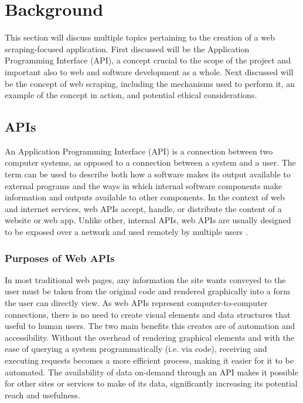 \chapter{Background}\label{bg}

This section will discuss multiple topics pertaining to the creation of a web scraping-focused application. First discussed will be the Application Programming Interface (API), a concept crucial to the scope of the project and important also to web and software development as a whole. Next discussed will be the concept of web scraping, including the mechanisms used to perform it, an example of the concept in action, and potential ethical considerations.

\section[Application Programming Interfaces (APIs)]{APIs}\label{sec:api}

An Application Programming Interface (API) is a connection between two computer systems, as opposed to a connection between a system and a user. The term can be used to describe both how a software makes its output available to external programs and the ways in which internal software components make information and outputs available to other components. In the context of web and internet services, web APIs accept, handle, or distribute the content of a website or web app. Unlike other, internal APIs, web APIs are usually designed to be exposed over a network and used remotely by multiple users \cite{geewax_api_2021}.

\subsection{Purposes of Web APIs}

In most traditional web pages, any information the site wants conveyed to the user must be taken from the original code and rendered graphically into a form the user can directly view. As web APIs represent computer-to-computer connections, there is no need to create visual elements and data structures that useful to human users. The two main benefits this creates are of automation and accessibility. Without the overhead of rendering graphical elements and with the ease of querying a system programmatically (i.e. via code), receiving and executing requests becomes a more efficient process, making it easier for it to be automated. The availability of data on-demand through an API makes it possible for other sites or services to make of its data, significantly increasing its potential reach and usefulness.

